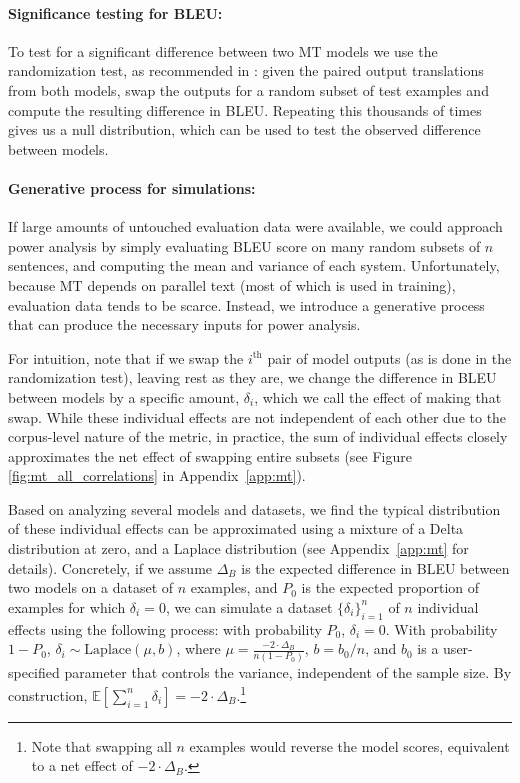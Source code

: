\documentclass[11pt,a4paper]{article}
\begin{document}
\paragraph{Significance testing for BLEU:} To test for a significant difference between two MT models
we use the
randomization test, as recommended in \citet{dror.2018}: given the paired output translations from both models, 
swap the outputs
for a random subset of test examples and compute the resulting difference in BLEU.
Repeating this thousands of times 
gives us a null distribution, which can be used to test the observed difference between models.

\paragraph{Generative process for simulations:}
If large amounts of untouched evaluation data were available, we could approach power analysis by simply evaluating BLEU score on many random subsets of $n$ sentences, and computing the mean and variance of each system. Unfortunately, because MT depends on parallel text (most of which is used in training), evaluation data tends to be scarce. Instead, we introduce a generative process that can produce the necessary inputs for power analysis.

For intuition, note that if we swap the $i^{\textrm{th}}$ pair of model outputs (as is done in the randomization test), leaving rest as they are, we change the difference in BLEU between models by a specific amount, $\delta_i$, which we call the effect of making that swap.
While these individual effects are not independent of each other due to the corpus-level nature of the metric, in practice, the sum of individual effects closely approximates the net effect of  swapping entire subsets (see Figure \ref{fig:mt_all_correlations} in   Appendix~\ref{app:mt}).

Based on analyzing several models and datasets, we find the typical distribution of these individual effects can be approximated using a mixture of a Delta distribution at zero, and a Laplace distribution (see Appendix~\ref{app:mt} for details).
Concretely, 
if we assume $\Delta_B$ is the expected difference in BLEU between two models on a dataset of $n$ examples, 
and $P_0$ is the expected proportion of examples for which $\delta_i=0$, 
we can simulate a dataset  $\{\delta_i\}_{i=1}^n$ of $n$ individual effects using the following process:
with probability $P_0$, $\delta_i = 0$. With probability $1 - P_0$, $\delta_i \sim \textrm{Laplace}(\mu, b)$, where $\mu=\frac{-2  \cdot \Delta_B}{n  (1-P_0)}$,  $b=b_0/n$,
and $b_0$ is a user-specified parameter that controls the variance, independent of the sample size.
By construction, $\mathbb{E}[\sum_{i=1}^n \delta_i] =  -2 \cdot \Delta_B$.\footnote{Note that swapping all $n$ examples would reverse the model scores, equivalent to a net effect of $-2 \cdot \Delta_B$.}
\end{document}
